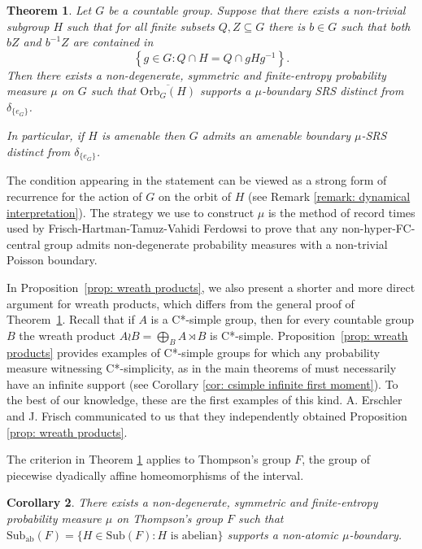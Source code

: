 \documentclass[reqno,a4paper,11pt]{amsart}
\numberwithin{equation}{section}
\newcommand{\1}{\mathbf{1}}
\newtheorem{thmA}{Theorem}
\newtheorem{corA}[thmA]{Corollary}
\theoremstyle{definition}
\begin{document}
\begin{thmA}\label{thm: syndetic}
	Let $G$ be a countable group. Suppose that there exists a non-trivial subgroup $H$ such that for all finite subsets $Q, Z \subseteq G$ there is $b \in G$ such that both $bZ$ and $b^{-1}Z$ are contained in
	\[
	\left\{g \in G : Q \cap H = Q \cap gHg^{-1}\right\}.
	\]
	Then there exists a non-degenerate, symmetric and finite-entropy probability measure $\mu$ on $G$ such that $\overline{\mathrm{Orb}_G(H)}$ supports a $\mu$-boundary SRS distinct from $\delta_{\{e_G\}}$.
	
	In particular, if $H$ is amenable then $G$ admits an amenable boundary $\mu$-SRS distinct from $\delta_{\{e_G\}}$.
\end{thmA}
The condition appearing in the statement can be viewed as a strong form of recurrence for the action of $G$ on the orbit of $H$ (see Remark \ref{remark: dynamical interpretation}). The strategy we use to construct $\mu$ is the method of record times used by Frisch-Hartman-Tamuz-Vahidi Ferdowsi \cite{FrischHartmanTamuzVahidiFerdowsi2019} to prove that any non-hyper-FC-central group admits non-degenerate probability measures with a non-trivial Poisson boundary.

In Proposition~\ref{prop: wreath products}, we also present a shorter and more direct argument for wreath products, which differs from the general proof of Theorem~\ref{thm: syndetic}.  Recall that if $A$ is a C*-simple group, then for every countable group $B$ the wreath product $A \wr B=\bigoplus_B A\rtimes B$ is C*-simple. Proposition~\ref{prop: wreath products} provides examples of C*-simple groups for which any probability measure witnessing C*-simplicity, as in the main theorems of \cite{HartmanKalantar2022} must necessarily have an infinite support (see Corollary \ref{cor: csimple infinite first moment}). To the best of our knowledge, these are the first examples of this kind. A. Erschler and J. Frisch communicated to us that they independently obtained Proposition \ref{prop: wreath products}.

The criterion in Theorem \ref{thm: syndetic} applies to Thompson's group $F$, the group of piecewise dyadically affine homeomorphisms of the interval.

\begin{corA} \label{cor: thompson F}
	There exists a non-degenerate, symmetric and finite-entropy probability measure $\mu$ on Thompson's group $F$ such that $\mathrm{Sub}_\mathrm{ab}(F) = \{H \in \mathrm{Sub}(F) : H \text{ is abelian}\}$ supports a non-atomic $\mu$-boundary.
\end{corA}
\end{document}
